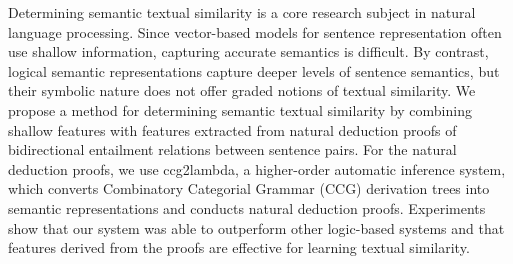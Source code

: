 Determining semantic textual similarity is a core research subject in natural language processing. Since vector-based models for sentence representation often use shallow information, capturing accurate semantics is difficult. By contrast, logical semantic representations capture deeper levels of sentence semantics, but their symbolic nature does not offer graded notions of textual similarity. We propose a method for determining semantic textual similarity by combining shallow features with features extracted from natural deduction proofs of bidirectional entailment relations between sentence pairs. For the natural deduction proofs, we use ccg2lambda, a higher-order automatic inference system, which converts Combinatory Categorial Grammar (CCG) derivation trees into semantic representations and conducts natural deduction proofs. Experiments show that our system was able to outperform other logic-based systems and that features derived from the proofs are effective for learning textual similarity.
